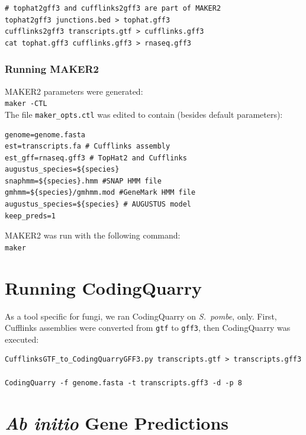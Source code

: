 \documentclass[a4paper,10pt]{report}
\begin{document}
\begin{verbatim}
# tophat2gff3 and cufflinks2gff3 are part of MAKER2
tophat2gff3 junctions.bed > tophat.gff3
cufflinks2gff3 transcripts.gtf > cufflinks.gff3
cat tophat.gff3 cufflinks.gff3 > rnaseq.gff3
\end{verbatim}


\subsubsection{Running MAKER2}

MAKER2 parameters were generated:\\

\noindent \texttt{maker -CTL}\\

\noindent The file \texttt{maker\_opts.ctl} was edited to contain (besides default parameters):

\begin{verbatim}
genome=genome.fasta
est=transcripts.fa # Cufflinks assembly
est_gff=rnaseq.gff3 # TopHat2 and Cufflinks
augustus_species=${species}
snaphmm=${species}.hmm #SNAP HMM file
gmhmm=${species}/gmhmm.mod #GeneMark HMM file
augustus_species=${species} # AUGUSTUS model
keep_preds=1
\end{verbatim}

\noindent MAKER2 was run with the following command:\\

\noindent \texttt{maker}\\

\section{Running CodingQuarry}

As a tool specific for fungi, we ran CodingQuarry on \textit{S.~pombe}, only. First, Cufflinks assemblies were converted from \texttt{gtf} to \texttt{gff3}, then CodingQuarry was executed:

\begin{verbatim}
CufflinksGTF_to_CodingQuarryGFF3.py transcripts.gtf > transcripts.gff3

CodingQuarry -f genome.fasta -t transcripts.gff3 -d -p 8
\end{verbatim}


\section{\textit{Ab initio} Gene Predictions}
\end{document}
